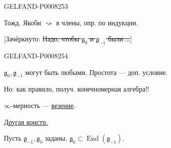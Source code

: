 \begin{GelfandAdjacentEvidence}{GELFAND-P000825}{3}


Тожд. Якоби \(\rightsquigarrow\) в члены, опр. по индукции.

[Зачёркнуто: \sout{Надо, чтобы \(\mathfrak g_0\) и \(\mathfrak g_{-1}\) были …}]
\end{GelfandAdjacentEvidence}
\begin{GelfandAdjacentEvidence}{GELFAND-P000825}{4}


\end{GelfandAdjacentEvidence}


\(\mathfrak g_0,\mathfrak g_{-1}\) могут быть любыми. Простота — доп. условие.

Но: как правило, получ. конечномерная алгебра!!

\(\infty\)-мерность — \uline{везение}.

\uline{Другая констр.}

Пусть \(\mathfrak g_{-1},\mathfrak g_0\) заданы,\qquad
\(\mathfrak g_0\subset\operatorname{End}(\mathfrak g_{-1})\).


